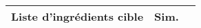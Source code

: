 \begin{longtable}{p{7cm}p{7cm}c}
                                                                                                                                                                                                                                                                                                                                                                                                                                                                                                                                                                                                                                                                                                                                                                                                                                                                                                                                                                                                                                                                                                                                                     Liste d'ingrédients cible &     Sim. \\ \hline
\midrule
\endfirsthead
\toprule

\end{longtable}
